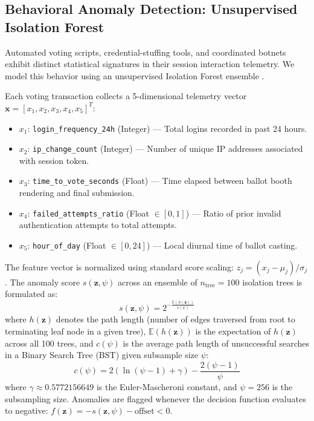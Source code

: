 \documentclass[conference]{IEEEtran}
\begin{document}
\subsection{Behavioral Anomaly Detection: Unsupervised Isolation Forest}
Automated voting scripts, credential-stuffing tools, and coordinated botnets exhibit distinct statistical signatures in their session interaction telemetry. We model this behavior using an unsupervised Isolation Forest ensemble \cite{liu2008isolation}.

Each voting transaction collects a 5-dimensional telemetry vector $\mathbf{x} = [x_1, x_2, x_3, x_4, x_5]^T$:
\begin{itemize}
    \item $x_1$: \texttt{login\_frequency\_24h} (Integer) --- Total logins recorded in past 24 hours.
    \item $x_2$: \texttt{ip\_change\_count} (Integer) --- Number of unique IP addresses associated with session token.
    \item $x_3$: \texttt{time\_to\_vote\_seconds} (Float) --- Time elapsed between ballot booth rendering and final submission.
    \item $x_4$: \texttt{failed\_attempts\_ratio} (Float $\in [0, 1]$) --- Ratio of prior invalid authentication attempts to total attempts.
    \item $x_5$: \texttt{hour\_of\_day} (Float $\in [0, 24]$) --- Local diurnal time of ballot casting.
\end{itemize}

The feature vector is normalized using standard score scaling: $z_j = (x_j - \mu_j) / \sigma_j$. The anomaly score $s(\mathbf{z}, \psi)$ across an ensemble of $n_{\text{tree}} = 100$ isolation trees is formulated as:
\begin{equation}
    s(\mathbf{z}, \psi) = 2^{-\frac{\mathbb{E}(h(\mathbf{z}))}{c(\psi)}}
\end{equation}
where $h(\mathbf{z})$ denotes the path length (number of edges traversed from root to terminating leaf node in a given tree), $\mathbb{E}(h(\mathbf{z}))$ is the expectation of $h(\mathbf{z})$ across all 100 trees, and $c(\psi)$ is the average path length of unsuccessful searches in a Binary Search Tree (BST) given subsample size $\psi$:
\begin{equation}
    c(\psi) = 2\left(\ln(\psi - 1) + \gamma\right) - \frac{2(\psi - 1)}{\psi}
\end{equation}
where $\gamma \approx 0.5772156649$ is the Euler-Mascheroni constant, and $\psi = 256$ is the subsampling size. Anomalies are flagged whenever the decision function evaluates to negative: $f(\mathbf{z}) = -s(\mathbf{z}, \psi) - \text{offset} < 0$.
\end{document}
